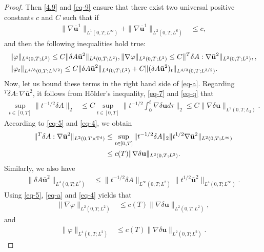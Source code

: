 \documentclass[11pt]{article}
\numberwithin{equation}{section}
\begin{document}
\begin{proof}
Then \eqref{4.9} and \eqref{eq-9} ensure that there exist two universal positive constants \( c \) and \( C \) such that if
\begin{align}
\|\nabla \bar{\mathbf{u}}^1\|_{L^1(0,T; L^\infty)} + \|\nabla \bar{\mathbf{u}}^1\|_{L^2(0,T; L^6)} &\leq c,\label{eq-q}
\end{align}
and then the following inequalities hold true:
\begin{align}
&\|\varphi\|_{L^4(0,T;L^2)} \leq C\|\delta A \bar{\mathbf{u}}^2\|_{L^4(0,T;L^2)}, \|\nabla \varphi\|_{L^2(0,T;L^2)} \leq C\|^T \delta A : \nabla \bar{\mathbf{u}}^2\|_{L^2(0,T;L^2)}, \notag\label{eq-a}, \\
&\|\varphi_t\|_{L^{4/3}(0,T;L^{3/2})} \leq C\|\delta A \bar{\mathbf{u}}^2\|_{L^4(0,T;L^2)} + C\|(\delta A \bar{\mathbf{u}}^2)_t\|_{L^{4/3}(0,T;L^{3/2})}.
\end{align}
Now, let us bound these terms in the right hand side  of \eqref{eq-a}. Regarding $^T \delta A : \nabla \bar{\mathbf{u}}^2$, it follows from H\"{o}lder's inequality, \eqref{eq-7} and \eqref{eq-q} that
\begin{align}
\sup_{t \in [0,T]} \|t^{-1/2} \delta A\|_2 &\leq C \sup_{t \in [0,T]} \big\|t^{-1/2} \int_0^t \nabla \delta \mathbf{u} d\tau \big\|_2 \leq C\|\nabla \delta \mathbf{u}\|_{L^2(0,T;L_2)}.\label{eq-4}
\end{align}
According to \eqref{eq-5} and \eqref{eq-4}, we obtain
\begin{align}
\|^T \delta A : \nabla \bar{\mathbf{u}}^2\|_{L^2(0,T \times \mathbb{T}^d)} &\leq \sup_{t \in [0,T]} \|t^{-1/2} \delta A\|_2 \|t^{1/2} \nabla \bar{\mathbf{u}}^2\|_{L^2(0,T;L^\infty)} \notag \\
&\leq c(T)\|\nabla \delta \mathbf{u}\|_{L^2(0,T;L^2)}.
\end{align}
Similarly, we also have
\begin{align}
\|\delta A \bar{\mathbf{u}}^2\|_{L^4(0,T;L^2)} &\leq \|t^{-1/2} \delta A\|_{L^\infty(0,T;L^2)} \|t^{1/2} \bar{\mathbf{u}}^2\|_{L^4(0,T;L^\infty)}.
\end{align}
Using \eqref{eq-5}, \eqref{eq-a} and \eqref{eq-4} yields that
\begin{align}
\|\nabla \varphi\|_{L^2(0,T;L^2)} &\leq c(T)\|\nabla \delta \mathbf{u}\|_{L^2(0,T;L^2)},\label{eq-b}
\end{align}
and
\begin{align}
\|\varphi\|_{L^4(0,T;L^2)} &\leq c(T)\|\nabla \delta \mathbf{u}\|_{L^2(0,T;L^2)}.
\label{eq-c}
\end{align}

\end{proof}
\end{document}
